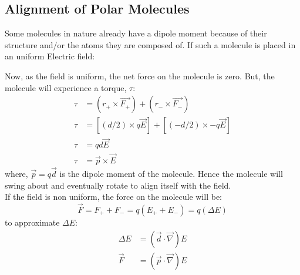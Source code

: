 \documentclass{article}
\begin{document}
\subsection{Alignment of Polar Molecules}
Some molecules in nature already have a dipole moment because of their structure and/or the atoms they are composed of.
If such a molecule is placed in an uniform Electric field:\\
\begin{figure}[H]
\end{figure}
Now, as the field is uniform, the net force on the molecule is zero.
But, the molecule will experience a torque, $\tau$:
\begin{align*}
	\tau & = (r_+ \times \vec{F_+}) + (r_- \times \vec{F_-})       \\
	\tau & = [(d/2) \times q \vec{E}] + [(-d/2) \times -q \vec{E}] \\
	\tau & = qd \vec{E}                                            \\
	\tau & = \vec{p} \times \vec{E}
\end{align*}
where, $\vec{p} = q \vec{d}$ is the dipole moment of the molecule.
Hence the molecule will swing about and eventually rotate to align itself with the field. \\
If the field is non uniform, the force on the molecule will be:
\[ \vec{F} = F_+ + F_- = q(E_+ + E_-) = q (\Delta E)\]
to approximate $\Delta E$:
\begin{align*}
	\Delta E & = \left(\vec{d} \cdot \vec{\nabla} \right) E \\
	\vec{F}  & = \left(\vec{p} \cdot \vec{\nabla} \right) E
\end{align*}
\end{document}
